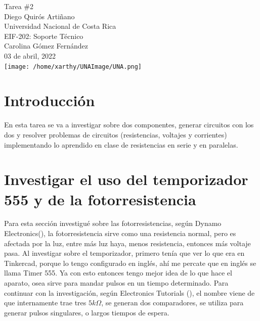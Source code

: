 \documentclass[stu, 12pt, letterpaper, donotrepeattitle, floatsintext, natbib, helv]{apa7}
\begin{document}
\begin{titlepage}
    \centering
    \vfill
    \LARGE Tarea \#2\\
    \vskip2cm
    \large Diego Quirós Artiñano \\
    Universidad Nacional de Costa Rica \\
    EIF-202: Soporte Técnico \\ 
    Carolina Gómez Fernández \\
    03 de abril, 2022 \\
    \vfill
    \texttt{[image: /home/xarthy/UNAImage/UNA.png]} \\
    \vfill
    \vfill
\end{titlepage}

\renewcommand\contentsname{\largeÍndice}
\tableofcontents
\setcounter{tocdepth}{2}
\newpage
\renewcommand{\listfigurename}{\largeÍndice de fíguras}
\listoffigures
\newpage
\renewcommand{\listtablename}{\largeÍndice de tablas}
\listoftables
\newpage


\section{Introducción}
En esta tarea se va a investigar sobre dos componentes, generar circuitos con los dos y resolver problemas de circuitos (resistencias, voltajes y corrientes) implementando lo aprendido en clase de resistencias en serie y en paralelas.

\section{Investigar el uso del temporizador 555 y de la fotorresistencia}
Para esta sección investigué sobre las fotorresistencias, según Dynamo Electronics(\cite{fotorresistencia}), la fotorresistencia sirve como una resistencia normal, pero es afectada por la luz, entre más luz haya, menos resistencia, entonces más voltaje pasa.
Al investigar sobre el temporizador, primero tenía que ver lo que era en Tinkercad, porque lo tengo configurado en inglés, ahí me percate que en inglés se llama Timer 555. Ya con esto entonces tengo mejor idea de lo que hace el aparato, osea sirve para mandar pulsos en un tiempo determinado. Para continuar con la investigación, según Electronics Tutorials (\cite{temporizadorDef}), el nombre viene de que internamente trae tres $5k\Omega$, se generan dos comparadores, se utiliza para generar pulsos singulares, o largos tiempos de espera. 
\end{document}

